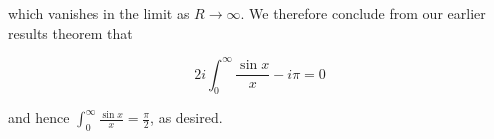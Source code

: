 \begin{solution}
    which vanishes in the limit as $R \to \infty$. We therefore conclude from our earlier results
    theorem that 

    $$
    2i \int_{0}^{\infty} {\frac{\sin{x}}{x}} - i \pi = 0
    $$

    and hence $\int_{0}^{\infty} {\frac{\sin{x}}{x}} = \frac{\pi}{2}$, as desired.

    \ \\
\end{solution}